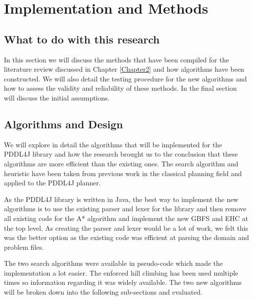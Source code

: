 \chapter{Implementation and Methods} %

\label{Chapter3} %

\section{What to do with this research}
In this section we will discuss the methods that have been compiled for the literature review discussed in Chapter \ref{Chapter2} and how algorithms have been constructed. We will also detail the testing procedure for the new algorithms and how to assess the validity and reliability of these methods. In the final section will discuss the initial assumptions. 

\section{Algorithms and Design}
We will explore in detail the algorithms that will be implemented for the PDDL4J library and how the research brought us to the conclusion that these algorithms are more efficient than the existing ones. The search algorithm and heuristic have been taken from previous work in the classical planning field and applied to the PDDL4J planner.

As the PDDL4J library is written in Java, the best way to implement the new algorithms is to use the existing parser and lexer for the library and then remove all existing code for the A* algorithm and implement the new GBFS and EHC at the top level. As creating the parser and lexer would be a lot of work, we felt this was the better option as the existing code was efficient at parsing the domain and problem files. 

The two search algorithms were available in pseudo-code which made the implementation a lot easier. The enforced hill climbing has been used multiple times so information regarding it was widely available\cite{HeuristicDomain}. The two new algorithms will be broken down into the following sub-sections and evaluated. 
